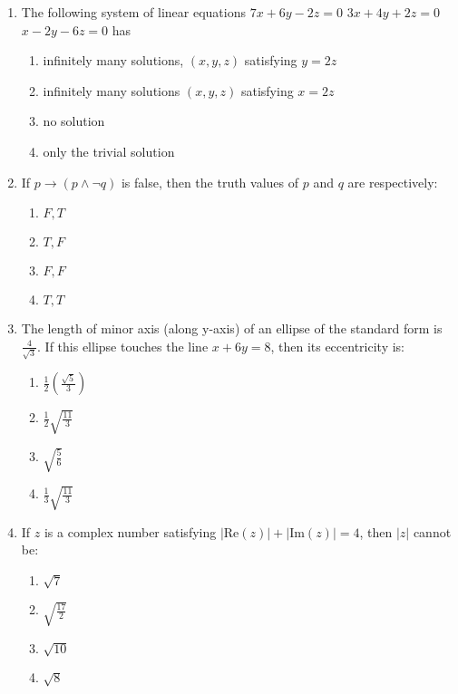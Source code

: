 \documentclass[journal]{IEEEtran}
\newcommand{\abs}[1]{\left| #1 \right|}
\begin{document}
\begin{enumerate}
    \item The following system of linear equations
    $ 7x + 6y - 2z = 0 $ 
    $ 3x + 4y + 2z = 0 $
    $ x - 2y - 6z = 0 $
    has
    \begin{enumerate}
        \item infinitely many solutions, $ (x, y, z) $ satisfying $ y = 2z $
        \item infinitely many solutions $ (x, y, z) $ satisfying $ x = 2z $
        \item no solution
        \item only the trivial solution
    \end{enumerate}

    \item If $ p \to (p \land \neg q) $ is false, then the truth values of $ p $ and $ q $ are respectively:
        \begin{multicols}{4}
        \begin{enumerate}
            \item $ F, T $  
            \item $ T, F $  
            \item $ F, F $  
            \item $ T, T $
        \end{enumerate}
        \end{multicols}

    \item The length of minor axis (along y-axis) of an ellipse of the standard form is $ \frac{4}{\sqrt{3}} $. If this ellipse touches the line $ x + 6y = 8 $, then its eccentricity is:
        \begin{enumerate}
            \item $ \frac{1}{2} \left( \frac{\sqrt{5}}{3} \right) $
            \item $ \frac{1}{2} \sqrt{\frac{11}{3}} $
            \item $ \sqrt{\frac{5}{6}} $
            \item $ \frac{1}{3} \sqrt{\frac{11}{3}} $
        \end{enumerate}  

    \item If $ z $ is a complex number satisfying $ \abs{\text{Re}(z)} + \abs{\text{Im}(z)} = 4 $, then $ \abs{z} $ cannot be:
        \begin{enumerate}
            \item $ \sqrt{7} $
            \item $ \sqrt{\frac{17}{2}} $
            \item $ \sqrt{10} $
            \item $ \sqrt{8} $
        \end{enumerate}


\end{enumerate}
\end{document}

